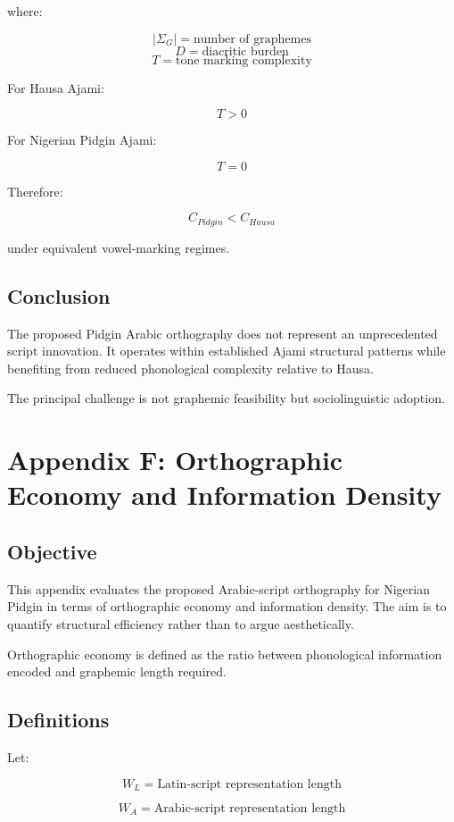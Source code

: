 \documentclass[12pt]{article}
\begin{document}
where:

\[
|\Sigma_G| = \text{number of graphemes}
\]
\[
D = \text{diacritic burden}
\]
\[
T = \text{tone marking complexity}
\]

For Hausa Ajami:

\[
T > 0
\]

For Nigerian Pidgin Ajami:

\[
T = 0
\]

Therefore:

\[
C_{Pidgin} < C_{Hausa}
\]

under equivalent vowel-marking regimes.

\subsection{Conclusion}

The proposed Pidgin Arabic orthography does not represent an unprecedented script innovation. It operates within established Ajami structural patterns while benefiting from reduced phonological complexity relative to Hausa.

The principal challenge is not graphemic feasibility but sociolinguistic adoption.

\section{Appendix F: Orthographic Economy and Information Density}

\subsection{Objective}

This appendix evaluates the proposed Arabic-script orthography for Nigerian Pidgin in terms of orthographic economy and information density. The aim is to quantify structural efficiency rather than to argue aesthetically.

Orthographic economy is defined as the ratio between phonological information encoded and graphemic length required.

\subsection{Definitions}

Let:

\[
W_L = \text{Latin-script representation length}
\]

\[
W_A = \text{Arabic-script representation length}
\]
\end{document}
